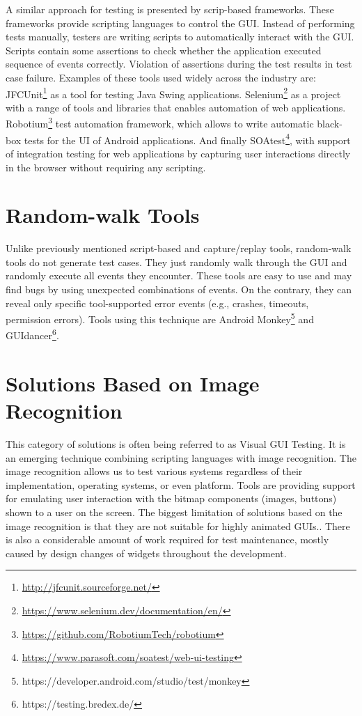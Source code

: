 A similar approach for testing is presented by scrip-based frameworks. These frameworks provide scripting languages to control the GUI. Instead of performing tests manually, testers are writing scripts to automatically interact with the GUI. Scripts contain some assertions to check whether the application executed sequence of events correctly. Violation of assertions during the test results in test case failure. Examples of these tools used widely across the industry are: JFCUnit\footnote{\url{http://jfcunit.sourceforge.net/}} as a tool for testing Java Swing applications. Selenium\footnote{\url{https://www.selenium.dev/documentation/en/}} as a project with a range of tools and libraries that enables automation of web applications. Robotium\footnote{\url{https://github.com/RobotiumTech/robotium}} test automation framework, which allows to write automatic black-box tests for the UI of Android applications. And finally SOAtest\footnote{\url{https://www.parasoft.com/soatest/web-ui-testing}}, with support of integration testing for web applications by capturing user interactions directly in the browser without requiring any scripting.\cite{NguyenBao2014Gait}

\section{Random-walk Tools}
Unlike previously mentioned script-based and capture/replay tools, random-walk tools do not generate test cases. They just randomly walk through the GUI and randomly execute all events they encounter. These tools are easy to use and may find bugs by using unexpected combinations of events. On the contrary, they can reveal only specific tool-supported error events (e.g., crashes, timeouts, permission errors). Tools using this technique are Android Monkey\footnote{https://developer.android.com/studio/test/monkey} and GUIdancer\footnote{https://testing.bredex.de/}.

\section{Solutions Based on Image Recognition}
This category of solutions is often being referred to as Visual GUI Testing. It is an emerging technique combining scripting languages with image recognition. The image recognition allows us to test various systems regardless of their implementation, operating systems, or even platform. Tools are providing support for emulating user interaction with the bitmap components (images, buttons) shown to a user on the screen. The biggest limitation of solutions based on the image recognition is that they are not suitable for highly animated GUIs.\cite{guitesting}. There is also a considerable amount of work required for test maintenance, mostly caused by design changes of widgets throughout the development.   

